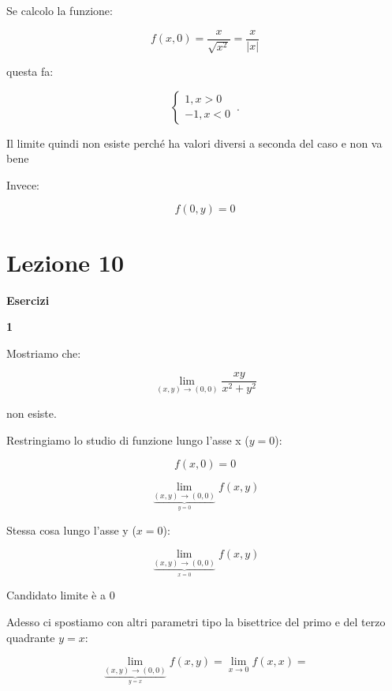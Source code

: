 \documentclass[11pt]{article}
\begin{document}
Se calcolo la funzione:

\[
    f(x,0) = \frac{x}{\sqrt{x^{2}}}= \frac{x}{|x|}
\]

questa fa:

\begin{equation}
    \begin{cases}
           1,x>0\\
           -1,x<0
    \end{cases}\,.
\end{equation}

Il limite quindi non esiste perché ha valori diversi a seconda del caso e non va bene

Invece:

\[
    f(0,y) = 0
\]

\section{Lezione 10}


\textbf{Esercizi} 

\textbf{1} 

Mostriamo che:

\[
    \lim_{ (x,y) \to (0,0) } \frac{xy}{x^{2}+y^{2}}
\]

non esiste.

Restringiamo lo studio di funzione lungo l'asse x ($y=0$):

\[
    f(x,0) = 0
\]

\[
    \lim_{ \underbrace{(x,y) \to (0,0)}_{y=0} } f(x,y)
\]

Stessa cosa lungo l'asse y ($x=0$):

\[
    \lim_{ \underbrace{(x,y) \to (0,0)}_{x=0} } f(x,y)
\]

Candidato limite è a 0 


Adesso ci spostiamo con altri parametri tipo la bisettrice del primo e del terzo quadrante $y=x$:

\[
    \lim_{ \underbrace{(x,y) \to (0,0)}_{y=x} } f(x,y) = \lim_{ x \to 0 } f(x,x)=
\]
\end{document}
